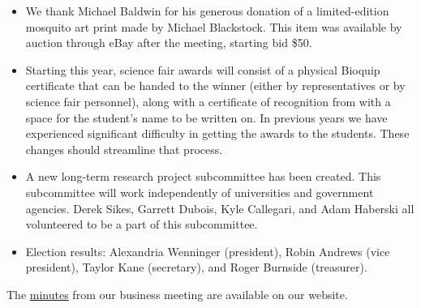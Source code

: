 \begin{itemize}

\item We thank Michael Baldwin for his generous donation of a limited-edition mosquito art print made by Michael Blackstock. This item was available by auction through eBay after the meeting, starting bid \$50. 

\item Starting this year, science fair awards will consist of a physical Bioquip certificate that can be handed to the winner (either by  representatives or by science fair personnel), along with a certificate of recognition from  with a space for the student’s name to be written on. In previous years we have experienced significant difficulty in getting the awards to the students. These changes should streamline that process. 

\item A new long-term research project subcommittee has been created. This subcommittee will work independently of universities and government agencies. Derek Sikes, Garrett Dubois, Kyle Callegari, and Adam Haberski all volunteered to be a part of this subcommittee. 

\item Election results: Alexandria Wenninger (president), Robin Andrews (vice president), Taylor Kane (secretary), and Roger Burnside (treasurer). 

\end{itemize}

The \href{http://www.akentsoc.org/doc/AKES_meeting_20200215_minutes.pdf}{minutes} from our business meeting are available on our website.


